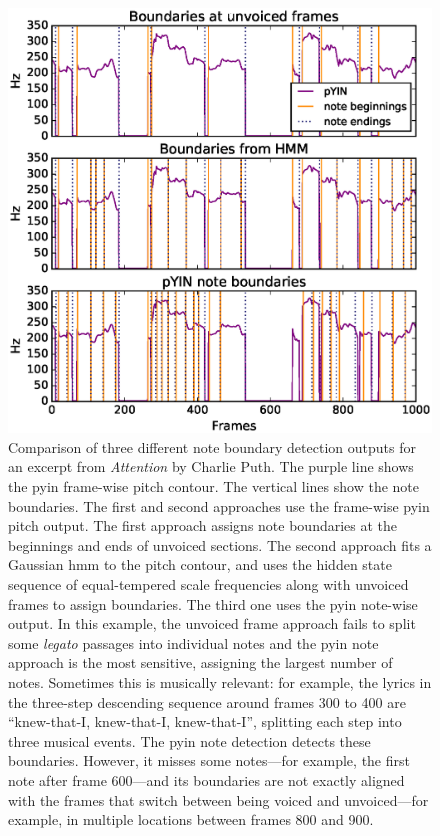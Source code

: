 \begin{figure}[h]
    \centering
    \includegraphics[width=\columnwidth]{figures/note_parse_comparison_attention_5.eps}
    \caption{Comparison of three different note boundary detection outputs for an excerpt from \textit{Attention} by Charlie Puth. The purple line shows the \gls{pyin} frame-wise pitch contour. The vertical lines show the note boundaries. The first and second approaches use the frame-wise \gls{pyin} pitch output. The first approach assigns note boundaries at the beginnings and ends of unvoiced sections. The second approach fits a Gaussian \gls{hmm} to the pitch contour, and uses the hidden state sequence of equal-tempered scale frequencies along with unvoiced frames to assign boundaries. The third one uses the \gls{pyin} note-wise output. In this example, the unvoiced frame approach fails to split some \textit{legato} passages into individual notes and the \gls{pyin} note approach is the most sensitive, assigning the largest number of notes. Sometimes this is musically relevant: for example, the lyrics in the three-step descending sequence around frames 300 to 400 are ``knew-that-I, knew-that-I, knew-that-I'', splitting each step into three musical events. The \gls{pyin} note detection detects these boundaries. However, it misses some notes---for example, the first note after frame 600---and its boundaries are not exactly aligned with the frames that switch between being voiced and unvoiced---for example, in multiple locations between frames 800 and 900.}
    \label{fig:note-parsing}
\end{figure}

